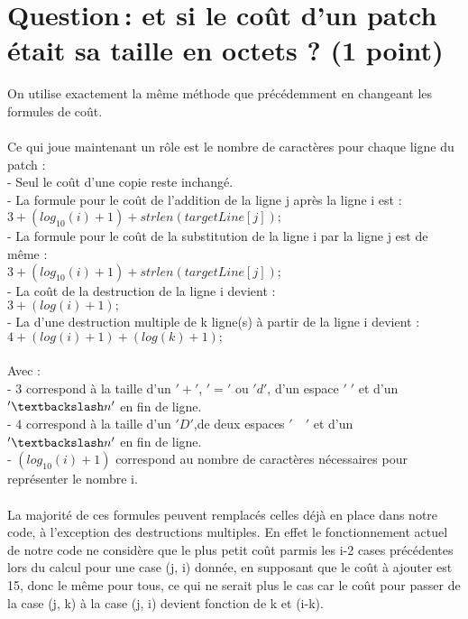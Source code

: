 \documentclass[a4paper, 10pt, french]{article}
\begin{document}
\section{Question\,: et  si le coût d'un patch était sa taille en octets ? (1 point)}
On utilise exactement la même méthode que précédemment en changeant les formules de coût.\\
\\
Ce qui joue maintenant un rôle est le nombre de caractères pour chaque ligne du patch :\\
\indent - Seul le coût d'une copie reste inchangé.\\
\indent - La formule pour le coût de l'addition de la ligne j après la ligne i est :\\
\indent  $3 + (log_{10}(i) + 1) + strlen(targetLine[j]);$\\
\indent - La formule pour le coût de la substitution de la ligne i par la ligne j est de même :\\
\indent  $3 + (log_{10}(i) + 1) + strlen(targetLine[j]);$\\
\indent - La coût de la destruction de la ligne i devient :\\
\indent  $3 + (log(i) + 1);$\\
\indent - La d'une destruction multiple de k ligne(s) à partir de la ligne i devient :\\
\indent  $4 + (log(i) + 1) + (log(k) + 1);$\\
\\
Avec :\\
  - $3$ correspond à la taille d'un $'+'$, $'='$ ou $'d'$, d'un espace $'\;'$ et d'un $'\textbackslash n'$ en fin de ligne.\\
  - $4$ correspond à la taille d'un $'D'$,de deux espaces $'\quad'$ et d'un $'\textbackslash n'$ en fin de ligne.\\
  - $(log_{10}(i) + 1)$ correspond au nombre de caractères nécessaires pour représenter le nombre i.\\
\\
La majorité de ces formules peuvent remplacés celles déjà en place dans notre code, à l'exception
des destructions multiples. En effet le fonctionnement actuel de notre code ne considère que le
plus petit coût parmis les i-2 cases précédentes lors du calcul pour une case (j, i) donnée, en 
supposant que le coût à ajouter est 15, donc le même pour tous, ce qui ne serait plus le cas car 
le coût pour passer de la case (j, k) à la case (j, i) devient fonction de k et (i-k).
\\
\end{document}
